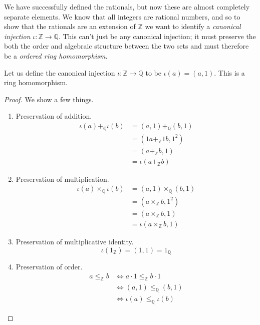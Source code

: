   We have successfully defined the rationals, but now these are almost completely separate elements. We know that all integers are rational numbers, and so to show that the rationals are an extension of $\mathbb{Z}$ we want to identify a \textit{canonical injection} $\iota: \mathbb{Z} \rightarrow \mathbb{Q}$. This can't just be any canonical injection; it must preserve the both the order and algebraic structure between the two sets and must therefore be a \textit{ordered ring homomorphism}. 

  \begin{theorem}
    Let us define the canonical injection $\iota: \mathbb{Z} \rightarrow \mathbb{Q}$ to be $\iota(a) = (a, 1)$. This is a ring homomorphism. 
  \end{theorem}
  \begin{proof} 
    We show a few things. 
    \begin{enumerate}
      \item Preservation of addition. 
        \begin{align}
          \iota(a) +_{\mathbb{Q}} \iota(b) & = (a, 1) +_{\mathbb{Q}} (b, 1) \\
                                           & = (1a +_{\mathbb{Z}} 1b, 1^2) \\
                                           & = (a +_{\mathbb{Z}} b, 1) \\
                                           & = \iota(a +_{\mathbb{Z}} b) 
        \end{align}
      \item Preservation of multiplication. 
        \begin{align}
          \iota(a) \times_{\mathbb{Q}} \iota(b) & = (a, 1) \times_{\mathbb{Q}} (b, 1) \\
                                                & = (a \times_{\mathbb{Z}} b, 1^2) \\
                                                & = (a \times_{\mathbb{Z}} b, 1) \\
                                                & = \iota(a \times_{\mathbb{Z}} b, 1)
        \end{align}
      \item Preservation of multiplicative identity. 
        \begin{equation}
          \iota(1_{\mathbb{Z}}) = (1, 1) = 1_{\mathbb{Q}}
        \end{equation}

      \item Preservation of order. 
      \begin{align}
        a \leq_{\mathbb{Z}} b & \iff a \cdot 1 \leq_{\mathbb{Z}} b \cdot 1 \\
                              & \iff (a, 1) \leq_{\mathbb{Q}} (b, 1) \\
                              & \iff \iota(a) \leq_{\mathbb{Q}} \iota(b)
      \end{align}
    \end{enumerate}
  \end{proof} 


